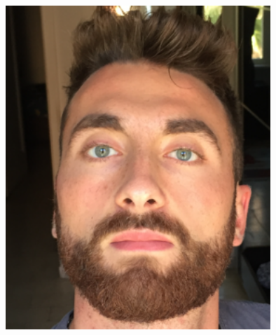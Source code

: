 \documentclass[9pt]{developercv} %
\begin{document}
\begin{minipage}[t]{0.215\textwidth} %
	\vspace{-\baselineskip} %
        \includegraphics[width=0.75\textwidth]{meCropped}
\end{minipage}

\vspace{0.5cm}
\vspace{0.5cm}

\end{document}
